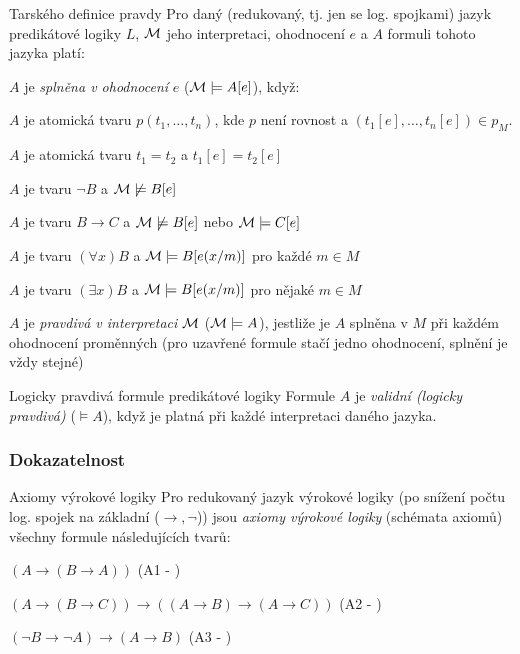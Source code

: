 \begin{definiceN}{Tarského definice pravdy}
Pro daný (redukovaný, tj. jen se  log. spojkami) jazyk predikátové logiky $L$, $\mathcal{M}$ jeho interpretaci, ohodnocení $e$ a $A$ formuli tohoto jazyka platí:
\begin{penumerate}
    \item $A$ je \emph{splněna v ohodnocení} $e$ ($\mathcal{M}\models A[e]$), když:
    \begin{pitemize}
	\item $A$ je atomická tvaru $p(t_1,\dots,t_n)$, kde $p$ není rovnost a $(t_1[e],\dots,t_n[e])\in p_M$.
	\item $A$ je atomická tvaru $t_1 = t_2$ a $t_1[e]=t_2[e]$
	\item $A$ je tvaru $\neg B$ a $\mathcal{M}\not\models B[e]$
	\item $A$ je tvaru $B\rightarrow C$ a $\mathcal{M}\not\models B[e]$ nebo $\mathcal{M}\models C[e]$
	\item $A$ je tvaru $(\forall x)B$ a $\mathcal{M}\models B[e(x/m)]$ pro každé $m\in M$
	\item $A$ je tvaru $(\exists x)B$ a $\mathcal{M}\models B[e(x/m)]$ pro nějaké $m\in M$
    \end{pitemize}
    \item $A$ je \emph{pravdivá v interpretaci} $\mathcal{M}$ ($\mathcal{M}\models A$), jestliže je $A$ splněna v $M$ při
	každém ohodnocení proměnných (pro uzavřené formule stačí jedno ohodnocení, splnění je vždy stejné)
   \end{penumerate}
\end{definiceN}

\begin{definiceN}{Logicky pravdivá formule predikátové logiky}
Formule $A$ je \emph{validní (logicky pravdivá)} ($\models A$), když je platná při každé interpretaci daného jazyka.
\end{definiceN}

\subsubsection*{Dokazatelnost}

\begin{definiceN}{Axiomy výrokové logiky}
Pro redukovaný jazyk výrokové logiky (po snížení počtu log. spojek na základní ($\rightarrow, \neg$)) jsou \emph{axiomy výrokové logiky} (schémata axiomů) všechny formule následujících tvarů:
\begin{pitemize}
    \item $(A\rightarrow (B\rightarrow A))$ 
	(A1 - )
    \item $(A\rightarrow (B\rightarrow C))\rightarrow ((A\rightarrow B) \rightarrow (A\rightarrow C))$ 
	(A2 - )
    \item $(\neg B\rightarrow \neg A)\rightarrow(A\rightarrow B)$ 
	(A3 - )
\end{pitemize}
\end{definiceN}

